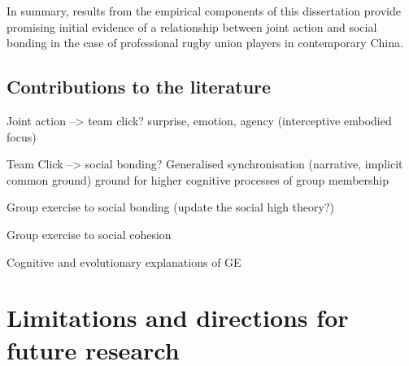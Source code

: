 In summary, results from the empirical components of this dissertation provide promising initial evidence of a relationship between joint action and social bonding in the case of professional rugby union players in contemporary China.









  \subsection{Contributions to the literature}

Joint action --> team click?
surprise, emotion, agency (interceptive embodied focus)

Team Click --> social bonding?
Generalised synchronisation (narrative, implicit common ground)
ground for higher cognitive processes of group membership


Group exercise to social bonding (update the social high theory?)

Group exercise to social cohesion

Cognitive and evolutionary explanations of GE





\section{Limitations and directions for future research}

